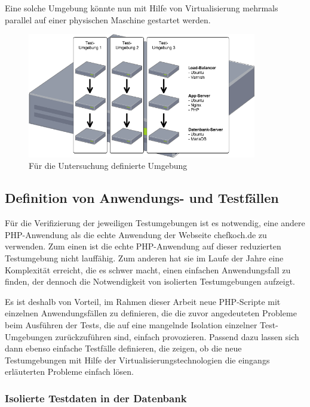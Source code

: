 Eine solche Umgebung könnte nun mit Hilfe von Virtualisierung mehrmals parallel auf einer physischen Maschine gestartet werden.

\begin{figure}[!ht]
  \begin{center}
    \includegraphics[width=10cm]{bilder/Untersuchungs-Umgebung.png}
    \caption{Für die Untersuchung definierte Umgebung}
  \end{center}
\end{figure}

\subsection{Definition von Anwendungs- und Testfällen}

Für die Verifizierung der jeweiligen Testumgebungen ist es notwendig, eine andere PHP-Anwendung als die echte Anwendung der Webseite chefkoch.de zu verwenden. Zum einen ist die echte PHP-Anwendung auf dieser reduzierten Testumgebung nicht lauffähig. Zum anderen hat sie im Laufe der Jahre eine Komplexität erreicht, die es schwer macht, einen einfachen Anwendungsfall zu finden, der dennoch die Notwendigkeit von isolierten Testumgebungen aufzeigt.

Es ist deshalb von Vorteil, im Rahmen dieser Arbeit neue PHP-Scripte mit einzelnen Anwendungsfällen zu definieren, die die zuvor angedeuteten Probleme beim Ausführen der Tests, die auf eine mangelnde Isolation einzelner Test-Umgebungen zurückzuführen sind, einfach provozieren. Passend dazu lassen sich dann ebenso einfache Testfälle definieren, die zeigen, ob die neue Testumgebungen mit Hilfe der Virtualisierungstechnologien die eingangs erläuterten Probleme einfach lösen.

\subsubsection{Isolierte Testdaten in der Datenbank}

